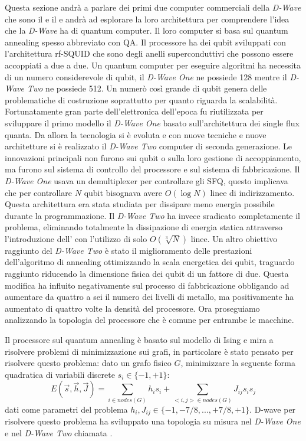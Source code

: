 \cite{ACI}Questa sezione andrà a parlare dei primi due computer commerciali della \textit{D-Wave} che sono il  e il  e andrà ad esplorare la loro architettura per comprendere l'idea che la \textit{D-Wave} ha di quantum computer. Il loro computer si basa sul quantum annealing spesso abbreviato con QA. Il processore ha dei qubit sviluppati con l'architettura rf-SQUID che sono degli anelli superconduttivi che possono essere accoppiati a due a due. Un quantum computer per eseguire algoritmi ha necessita di un numero considerevole di qubit, il \textit{D-Wave One} ne possiede 128 mentre il \textit{D-Wave Two} ne possiede 512. Un numerò così grande di qubit genera delle problematiche di costruzione soprattutto per quanto riguarda la scalabilità. Fortunatamente gran parte dell'elettronica dell'epoca fu riutilizzata per sviluppare il primo modello il \textit{D-Wave One} basato sull'architettura dei  single flux quanta. Da allora la tecnologia si è evoluta e con nuove tecniche e nuove architetture si è realizzato il \textit{D-Wave Two} computer di seconda generazione. Le innovazioni principali non furono sui qubit o sulla loro gestione di accoppiamento, ma furono sul sistema di controllo del processore e sul sistema di fabbricazione. Il \textit{D-Wave One} usava un demultiplexer per controllare gli SFQ, questo implicava che per controllare $N$ qubit bisognava avere $O(\log{N})$ linee di indirizzamento. Questa architettura era stata studiata per dissipare meno energia possibile durante la programmazione. Il \textit{D-Wave Two} ha invece sradicato completamente il problema, eliminando totalmente la dissipazione di energia statica attraverso l'introduzione dell' con l'utilizzo di solo $O(\sqrt[3]{N})$ linee.
Un altro obiettivo raggiunto del \textit{D-Wave Two} è stato il miglioramento delle prestazioni dell'algoritmo di annealing ottimizzando la scala energetica dei qubit, traguardo raggiunto riducendo la dimensione fisica dei qubit di un fattore di due. Questa modifica ha influito negativamente sul processo di fabbricazione obbligando ad aumentare da quattro a sei il numero dei livelli di metallo, ma positivamente ha aumentato di quattro volte la densità del processore. Ora proseguiamo analizzando la topologia del processore che è comune per entrambe le macchine.

\cite{ACI}Il processore sul quantum annealing è basato sul modello di Ising e mira a risolvere problemi di minimizzazione sui grafi, in particolare è stato pensato per risolvere questo problema: dato un grafo fisico $G$, minimizzare la seguente forma quadratica di variabili discrete $s_i \in \{-1, +1\}$:
$$E(\vec{s}, \vec{h}, \vec{J}) = \sum_{i \in nodes(G)} h_i s_i + \sum_{<i,j> \in nodes(G)} J_{ij} s_i s_j$$
dati come parametri del problema $h_i, J_{ij} \in \{-1, -7/8, ..., +7/8, +1\}$.
D-wave per risolvere questo problema ha sviluppato una topologia su misura nel \textit{D-Wave One} e nel \textit{D-Wave Two} chiamata .

